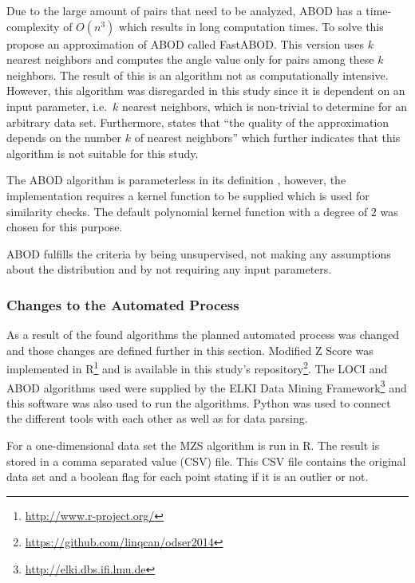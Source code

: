 Due to the large amount of pairs that need to be analyzed, ABOD has a time-complexity of $O(n^{3})$ which results in long computation times. To solve this \citet{kriegel2008angle} propose an approximation of ABOD called FastABOD\@. This version uses $k$ nearest neighbors and computes the angle value only for pairs among these $k$ neighbors. The result of this is an algorithm not as computationally intensive. However, this algorithm was disregarded in this study since it is dependent on an input parameter, i.e.\ $k$ nearest neighbors, which is non-trivial to determine for an arbitrary data set. Furthermore, \citet{kriegel2008angle} states that ``the quality of the approximation depends on the number $k$ of nearest neighbors'' which further indicates that this algorithm is not suitable for this study.


The ABOD algorithm is parameterless in its definition \citep{kriegel2008angle}, however, the implementation requires a kernel function to be supplied which is used for similarity checks. The default polynomial kernel function with a degree of $2$ was chosen for this purpose.


ABOD fulfills the criteria by being unsupervised, not making any assumptions about the distribution and by not requiring any input parameters.


\subsubsection{Changes to the Automated Process}
As a result of the found algorithms the planned automated process was changed and those changes are defined further in this section.
Modified Z Score was implemented in \textsf{R}\footnote{\url{http://www.r-project.org/}} and is available in this study's repository\footnote{\url{https://github.com/linqcan/odser2014}}. The LOCI and ABOD algorithms used were supplied by the ELKI Data Mining Framework\footnote{\url{http://elki.dbs.ifi.lmu.de}}\citep{elki2013} and this software was also used to run the algorithms. \textsf{Python} was used to connect the different tools with each other as well as for data parsing.


For a one-dimensional data set the MZS algorithm is run in \textsf{R}. The result is stored in a comma separated value (CSV) file. This CSV file contains the original data set and a boolean flag for each point stating if it is an outlier or not. 


